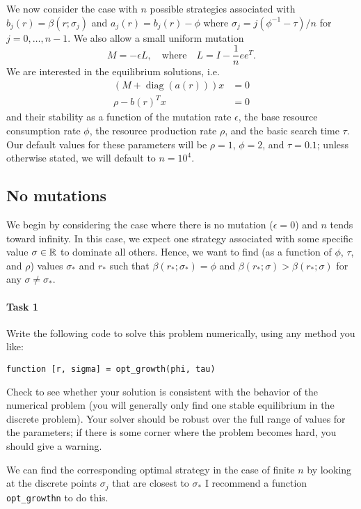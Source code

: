 \documentclass[12pt, leqno]{article} %
\begin{document}
We now consider the case with $n$ possible strategies associated with
$b_j(r) = \beta(r; \sigma_j)$ and $a_j(r) = b_j(r)-\phi$ where
$\sigma_{j} = j (\phi^{-1}-\tau)/n$ for $j = 0, \ldots, n-1$.
We also allow a small uniform mutation
\[
  M = -\epsilon L, \quad \mbox{where} \quad L = I - \frac{1}{n} ee^T.
\]
We are interested in the equilibrium solutions, i.e.
\begin{align*}
  \left(M + \operatorname{diag}(a(r))\right)x &= 0\\
  \rho - b(r)^T x &= 0
\end{align*}
and their stability as a function of the mutation rate $\epsilon$, the
base resource consumption rate $\phi$, the resource production rate
$\rho$, and the basic search time $\tau$.  Our default values for
these parameters will be $\rho = 1$, $\phi = 2$, and $\tau = 0.1$;
unless otherwise stated, we will default to $n = 10^4$.

\subsection{No mutations}

We begin by considering the case where there is no mutation ($\epsilon
= 0$) and $n$ tends toward infinity.  In this case, we expect one
strategy associated with some specific value $\sigma \in \mathbb{R}$ to
dominate all others.  Hence, we want to find (as a function of $\phi$,
$\tau$, and $\rho$) values $\sigma_*$ and $r_*$ such that
$\beta(r_*; \sigma_*) = \phi$ and
$\beta(r_*; \sigma) > \beta(r_*; \sigma)$ for any $\sigma \neq \sigma_*$.

\paragraph{Task 1}
Write the following code to solve this problem numerically,
using any method you like:
\begin{lstlisting}[frame=single]
function [r, sigma] = opt_growth(phi, tau)
\end{lstlisting}
Check to see whether your solution is consistent with the behavior
of the numerical problem (you will generally only find one
stable equilibrium in the discrete problem).  Your solver should
be robust over the full range of values for the parameters;
if there is some corner where the problem becomes hard, you should
give a warning.

We can find the corresponding optimal strategy in the case of finite
$n$ by looking at the discrete points $\sigma_j$ that are closest to
$\sigma_*$  I recommend a function \verb|opt_growthn| to do this.
\end{document}
